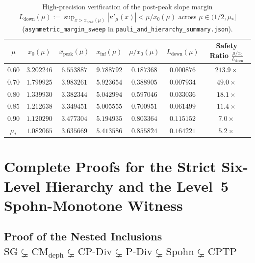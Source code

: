 \documentclass[onecolumn,10pt,notitlepage,amsmath,amssymb,floatfix]{revtex4-2}
\theoremstyle{plain}
\theoremstyle{definition}
\newcommand{\mustar}{\mu_*}
\begin{document}
\begin{table}[h]
\centering
\caption{High-precision verification of the post-peak slope margin $L_{\mathrm{down}}(\mu) := \sup_{x > x_{\mathrm{peak}}(\mu)} |\kappa'_\mu(x)| < \mu/x_0(\mu)$ across $\mu \in (1/2, \mustar]$ (\texttt{asymmetric\_margin\_sweep} in \texttt{pauli\_and\_hierarchy\_summary.json}).}
\label{tab:S4_margin_sweep}
\setlength{\tabcolsep}{6pt}
\begin{tabular}{@{}ccccccc@{}}
\toprule
$\mu$ & $x_0(\mu)$ & $x_{\mathrm{peak}}(\mu)$ & $x_{\mathrm{inf}}(\mu)$ & $\mu / x_0(\mu)$ & $L_{\mathrm{down}}(\mu)$ & Safety Ratio $\frac{\mu/x_0}{L_{\mathrm{down}}}$ \\
\midrule
$0.60$    & $3.202246$ & $6.553887$ & $9.788792$ & $0.187368$ & $0.000876$ & $213.9\times$ \\
$0.70$    & $1.799925$ & $3.983261$ & $5.923654$ & $0.388905$ & $0.007934$ & $49.0\times$ \\
$0.80$    & $1.339930$ & $3.382344$ & $5.042994$ & $0.597046$ & $0.033036$ & $18.1\times$ \\
$0.85$    & $1.212638$ & $3.349451$ & $5.005555$ & $0.700951$ & $0.061499$ & $11.4\times$ \\
$0.90$    & $1.120290$ & $3.477304$ & $5.194935$ & $0.803364$ & $0.115152$ & $7.0\times$ \\
$\mustar$ & $1.082065$ & $3.635669$ & $5.413586$ & $0.855824$ & $0.164221$ & $5.2\times$ \\
\bottomrule
\end{tabular}
\end{table}

\section{Complete Proofs for the Strict Six-Level Hierarchy and the Level~5 Spohn-Monotone Witness}
\label{sec:S5}

\subsection{Proof of the Nested Inclusions \texorpdfstring{$\mathrm{SG} \subsetneq \mathrm{CM}_{\mathrm{deph}} \subsetneq \mathrm{CP\text{-}Div} \subsetneq \mathrm{P\text{-}Div} \subsetneq \mathrm{Spohn} \subsetneq \mathrm{CPTP}$}{SG < CM\_deph < CP-Div < P-Div < Spohn < CPTP}}
\end{document}
